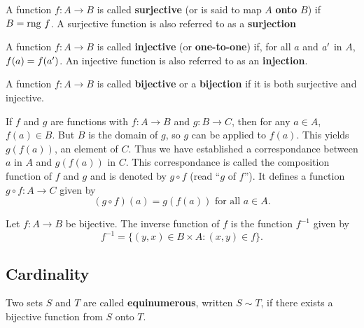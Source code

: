 \documentclass[12pt]{article}
\begin{document}
\begin{definition}[Surjective]
  A function $f : A \rightarrow B$ is called \textbf{surjective} (or is said to map $A$
  \textbf{onto} $B$) if $B = \text{rng }f$. A surjective function is also referred to
  as a \textbf{surjection}
\end{definition}

\begin{definition}[Injective]
  A function $f : A \rightarrow B$ is called \textbf{injective} (or \textbf{one-to-one})
  if, for all $a$ and $a'$ in $A$, $f(a) = f(a')$. An injective function
  is also referred to as an \textbf{injection}.
\end{definition}

\begin{definition}[Bijective]
A function $f : A \rightarrow B$ is called \textbf{bijective} or a \textbf{bijection} if
it is both surjective and injective.
\end{definition}

\begin{definition}[Composition]
  If $f$ and $g$ are functions with $f : A  \rightarrow B$ and $g : B \rightarrow C$, then for any
  $a \in A$, $f(a) \in B$. But $B$ is  the domain of $g$, so $g$ can be applied to
  $f(a)$. This yields $g(f(a))$, an element of $C$. Thus we have established a
  correspondance between $a$ in $A$  and $g(f(a))$ in $C$. This correspondance
  is called the composition function of $f$ and  $g$ and is denoted by $g \circ f$
  (read ``$g$ of $f$''). It  defines a function $g \circ f : A \rightarrow  C$ given by $$(g \circ
  f)(a) = g(f(a)) \text{ for all } a \in A.$$
\end{definition}

\begin{definition}[Inverse]
  Let $f : A \rightarrow B$ be bijective. The inverse function of $f$ is the function
  $f^{-1}$ given by $$f^{-1} = \{ (y,x) \in B \times A : (x,y) \in f \}.$$
\end{definition}

\subsection{Cardinality}
\label{sec:org86cb30b}
\begin{definition}[Equinumerous]
  Two sets $S$ and $T$ are called \textbf{equinumerous}, written $S \sim T$, if
  there exists a bijective function from $S$ onto $T$.
\end{definition}
\end{document}
